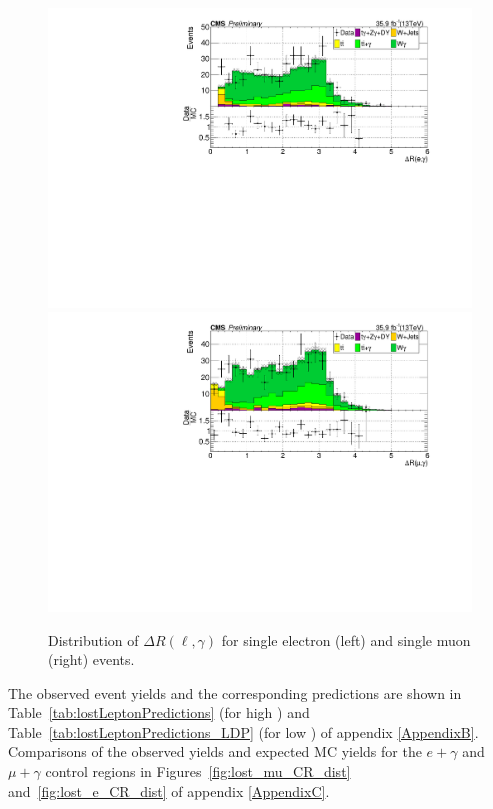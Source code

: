 \begin{figure}
\centering
\includegraphics[width=0.48\linewidth]{../Figures/Chap3/lost_lepton/lostElectronDeltaR.pdf}
\includegraphics[width=0.48\linewidth]{../Figures/Chap3/lost_lepton/lostMuonDeltaR.pdf}
\captionsetup{width=.9\linewidth}
\caption{Distribution of $\Delta R(\ell,\gamma)$ for single
electron (left) and single muon (right) events.}
\label{fig:lost_ell_dR_dist}
\end{figure}

The observed event yields and the corresponding predictions are shown in Table~\ref{tab:lostLeptonPredictions} (for high \dphi) and Table~\ref{tab:lostLeptonPredictions_LDP} (for low \dphi) of appendix \ref{AppendixB}. 
Comparisons of the observed yields and expected MC yields for the $e+\gamma$ and $\mu+\gamma$ control 
regions in Figures~\ref{fig:lost_mu_CR_dist} and~\ref{fig:lost_e_CR_dist} of appendix \ref{AppendixC}.

